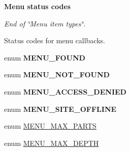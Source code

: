 \begin{Indent}{\bf Menu status codes}\par
{\em End of \char`\"{}Menu item types\char`\"{}.

Status codes for menu callbacks. }\begin{CompactItemize}
\item 
enum \textbf{MENU\_\-FOUND} 
\item 
enum \textbf{MENU\_\-NOT\_\-FOUND} 
\item 
enum \textbf{MENU\_\-ACCESS\_\-DENIED} 
\item 
enum \textbf{MENU\_\-SITE\_\-OFFLINE} 
\end{CompactItemize}
\end{Indent}
\begin{Indent}{\bf }\par
\begin{CompactItemize}
\item 
enum \hyperlink{group__menu_g57d50c60b259e886bac766d4ef33abb5}{MENU\_\-MAX\_\-PARTS} 
\item 
enum \hyperlink{group__menu_gae0d9e2610b50124cc0d2b120058c9b8}{MENU\_\-MAX\_\-DEPTH} 
\end{CompactItemize}
\end{Indent}
